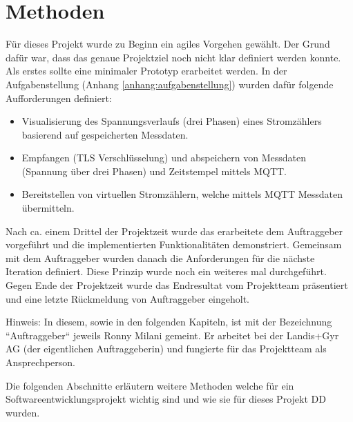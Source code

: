 \chapter{Methoden}
\label{methoden}
Für dieses Projekt wurde zu Beginn ein agiles Vorgehen gewählt.
Der Grund dafür war, dass das genaue Projektziel noch nicht klar definiert werden konnte.
Als erstes sollte eine minimaler Prototyp erarbeitet werden.
In der Aufgabenstellung (Anhang \ref{anhang:aufgabenstellung}) wurden dafür folgende Aufforderungen definiert:
\begin{itemize}
      \item Visualisierung des Spannungsverlaufs (drei Phasen) eines Stromzählers
            basierend auf gespeicherten Messdaten.
      \item Empfangen (TLS Verschlüsselung) und abspeichern von Messdaten (Spannung über drei Phasen) und
            Zeitstempel mittels MQTT.
      \item Bereitstellen von virtuellen Stromzählern, welche mittels MQTT Messdaten
            übermitteln.
\end{itemize}
Nach ca. einem Drittel der Projektzeit wurde das erarbeitete dem Auftraggeber vorgeführt und die implementierten Funktionalitäten demonstriert.
Gemeinsam mit dem Auftraggeber wurden danach die Anforderungen für die nächste Iteration definiert.
Diese Prinzip wurde noch ein weiteres mal durchgeführt.
Gegen Ende der Projektzeit wurde das Endresultat vom Projektteam präsentiert und eine letzte Rückmeldung von Auftraggeber eingeholt.


Hinweis: In diesem, sowie in den folgenden Kapiteln, ist mit der Bezeichnung ``Auftraggeber``
jeweils Ronny Milani gemeint. 
Er arbeitet bei der Landis+Gyr AG (der eigentlichen Auftraggeberin) und fungierte für das Projektteam als Ansprechperson.



Die folgenden Abschnitte erläutern weitere Methoden welche für ein Softwareentwicklungsprojekt
wichtig sind und wie sie für dieses Projekt DD wurden.


